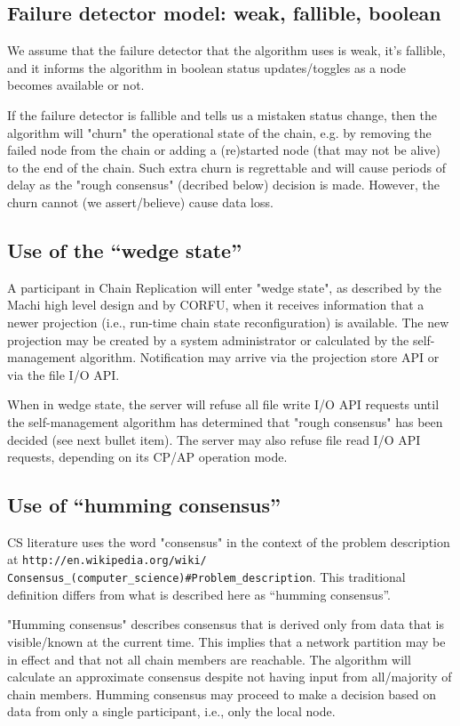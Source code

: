 \documentclass[preprint,10pt]{sigplanconf}
\begin{document}
\subsection{Failure detector model: weak, fallible, boolean}

We assume that the failure detector that the algorithm uses is weak,
it's fallible, and it informs the algorithm in boolean status
updates/toggles as a node becomes available or not.

If the failure detector is fallible and tells us a mistaken status
change, then the algorithm will "churn" the operational state of the
chain, e.g. by removing the failed node from the chain or adding a
(re)started node (that may not be alive) to the end of the chain.
Such extra churn is regrettable and will cause periods of delay as the
"rough consensus" (decribed below) decision is made.  However, the
churn cannot (we assert/believe) cause data loss.

\subsection{Use of the ``wedge state''}

A participant in Chain Replication will enter "wedge state", as
described by the Machi high level design \cite{machi-design} and by CORFU,
when it receives information that
a newer projection (i.e., run-time chain state reconfiguration) is
available.  The new projection may be created by a system
administrator or calculated by the self-management algorithm.
Notification may arrive via the projection store API or via the file
I/O API.

When in wedge state, the server will refuse all file write I/O API
requests until the self-management algorithm has determined that
"rough consensus" has been decided (see next bullet item).  The server
may also refuse file read I/O API requests, depending on its CP/AP
operation mode.

\subsection{Use of ``humming consensus''}

CS literature uses the word "consensus" in the context of the problem
description at
{\tt http://en.wikipedia.org/wiki/ Consensus\_(computer\_science)\#Problem\_description}.
This traditional definition differs from what is described here as
``humming consensus''.

"Humming consensus" describes
consensus that is derived only from data that is visible/known at the current
time.  This implies that a network partition may be in effect and that
not all chain members are reachable.  The algorithm will calculate
an approximate consensus despite not having input from all/majority
of chain members.  Humming consensus may proceed to make a
decision based on data from only a single participant, i.e., only the local
node.
\end{document}
